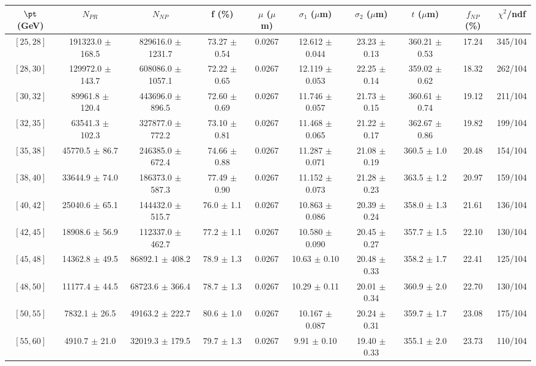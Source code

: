 \begin{tabular}{c||c|c|c|c|c|c|c||c|c}
$\pt$ (GeV) & $N_{PR}$ & $N_{NP}$ & f (\%) & $\mu$ ($\mu$m) & $\sigma_1$ ($\mu$m) & $\sigma_2$ ($\mu$m)  & $t$ ($\mu$m) & $f_{NP}$ (\%) & $\chi^2$/ndf \\
\hline
$[25, 28]$ & 191323.0 $\pm$ 168.5 & 829616.0 $\pm$ 1231.7 & 73.27 $\pm$ 0.54 & 0.0267 & 12.612 $\pm$ 0.044 & 23.23 $\pm$ 0.13 & 360.21 $\pm$ 0.53 & 17.24 & 345/104\\
$[28, 30]$ & 129972.0 $\pm$ 143.7 & 608086.0 $\pm$ 1057.1 & 72.22 $\pm$ 0.65 & 0.0267 & 12.119 $\pm$ 0.053 & 22.25 $\pm$ 0.14 & 359.02 $\pm$ 0.62 & 18.32 & 262/104\\
$[30, 32]$ & 89961.8 $\pm$ 120.4 & 443696.0 $\pm$ 896.5 & 72.60 $\pm$ 0.69 & 0.0267 & 11.746 $\pm$ 0.057 & 21.73 $\pm$ 0.15 & 360.61 $\pm$ 0.74 & 19.12 & 211/104\\
$[32, 35]$ & 63541.3 $\pm$ 102.3 & 327877.0 $\pm$ 772.2 & 73.10 $\pm$ 0.81 & 0.0267 & 11.468 $\pm$ 0.065 & 21.22 $\pm$ 0.17 & 362.67 $\pm$ 0.86 & 19.82 & 199/104\\
$[35, 38]$ & 45770.5 $\pm$ 86.7 & 246385.0 $\pm$ 672.4 & 74.66 $\pm$ 0.88 & 0.0267 & 11.287 $\pm$ 0.071 & 21.08 $\pm$ 0.19 & 360.5 $\pm$ 1.0 & 20.48 & 154/104\\
$[38, 40]$ & 33644.9 $\pm$ 74.0 & 186373.0 $\pm$ 587.3 & 77.49 $\pm$ 0.90 & 0.0267 & 11.152 $\pm$ 0.073 & 21.28 $\pm$ 0.23 & 363.5 $\pm$ 1.2 & 20.97 & 159/104\\
$[40, 42]$ & 25040.6 $\pm$ 65.1 & 144432.0 $\pm$ 515.7 & 76.0 $\pm$ 1.1 & 0.0267 & 10.863 $\pm$ 0.086 & 20.39 $\pm$ 0.24 & 358.0 $\pm$ 1.3 & 21.61 & 136/104\\
$[42, 45]$ & 18908.6 $\pm$ 56.9 & 112337.0 $\pm$ 462.7 & 77.2 $\pm$ 1.1 & 0.0267 & 10.580 $\pm$ 0.090 & 20.45 $\pm$ 0.27 & 357.7 $\pm$ 1.5 & 22.10 & 130/104\\
$[45, 48]$ & 14362.8 $\pm$ 49.5 & 86892.1 $\pm$ 408.2 & 78.9 $\pm$ 1.3 & 0.0267 & 10.63 $\pm$ 0.10 & 20.48 $\pm$ 0.33 & 358.2 $\pm$ 1.7 & 22.41 & 125/104\\
$[48, 50]$ & 11177.4 $\pm$ 44.5 & 68723.6 $\pm$ 366.4 & 78.7 $\pm$ 1.3 & 0.0267 & 10.29 $\pm$ 0.11 & 20.01 $\pm$ 0.34 & 360.9 $\pm$ 2.0 & 22.70 & 130/104\\
$[50, 55]$ & 7832.1 $\pm$ 26.5 & 49163.2 $\pm$ 222.7 & 80.6 $\pm$ 1.0 & 0.0267 & 10.167 $\pm$ 0.087 & 20.24 $\pm$ 0.31 & 359.7 $\pm$ 1.7 & 23.08 & 175/104\\
$[55, 60]$ & 4910.7 $\pm$ 21.0 & 32019.3 $\pm$ 179.5 & 79.7 $\pm$ 1.3 & 0.0267 & 9.91 $\pm$ 0.10 & 19.40 $\pm$ 0.33 & 355.1 $\pm$ 2.0 & 23.73 & 110/104\\

\end{tabular}
